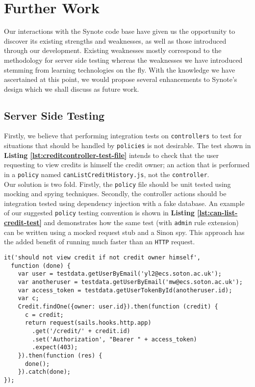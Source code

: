\chapter{Further Work}
\label{chap:further-work}

Our interactions with the Synote code base have given us the opportunity to discover its existing strengths and weaknesses, as well as those introduced through our development. Existing weaknesses mostly correspond to the methodology for server side testing whereas the weaknesses we have introduced stemming from learning technologies on the fly. With the knowledge we have ascertained at this point, we would propose several enhancements to Synote's design which we shall discuss as future work.

\section{Server Side Testing}
\label{subsec:server-side-testing}

Firstly, we believe that performing integration tests on \texttt{controllers} to test for situations that should be handled by \texttt{policies} is not desirable. The test shown in \textbf{Listing \ref{lst:creditcontroller-test-file}} intends to check that the user requesting to view credits is himself the credit owner; an action that is performed in a \texttt{policy} named \texttt{canListCreditHistory.js}, not the \texttt{controller}.\\

Our solution is two fold. Firstly, the \texttt{policy} file should be unit tested using mocking and spying techniques. Secondly, the controller actions should be integration tested using dependency injection with a fake database. An example of our suggested \texttt{policy} testing convention is shown in \textbf{Listing \ref{lst:can-list-credit-test}} and demonstrates how the same test (with \texttt{admin} rule extension) can be written using a mocked request stub and a Sinon spy. This approach has the added benefit of running much faster than an \texttt{HTTP} request.\\

\begin{listing}[H]
\begin{verbatim}
it('should not view credit if not credit owner himself',
  function (done) {
    var user = testdata.getUserByEmail('yl2@ecs.soton.ac.uk');
    var anotheruser = testdata.getUserByEmail('mw@ecs.soton.ac.uk');
    var access_token = testdata.getUserTokenById(anotheruser.id);
    var c;
    Credit.findOne({owner: user.id}).then(function (credit) {
      c = credit;
      return request(sails.hooks.http.app)
        .get('/credit/' + credit.id)
        .set('Authorization', "Bearer " + access_token)
        .expect(403);
    }).then(function (res) {
      done();
    }).catch(done);
});
\end{verbatim}
\label{lst:creditcontroller-test-file}
\end{listing}

